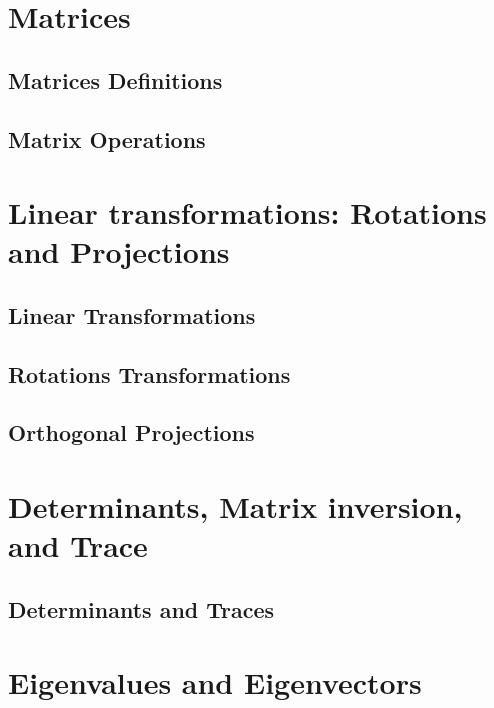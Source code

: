 \documentclass[11pt]{beamer}
\begin{document}
\section{Matrices}
\subsection{Matrices Definitions}
  
\subsection{Matrix Operations}



\section{Linear transformations: Rotations and Projections}
\subsection{Linear Transformations}


\subsection{Rotations Transformations}


\subsection{Orthogonal Projections}


\section{Determinants, Matrix inversion, and Trace}
\subsection{Determinants and Traces}



\section{Eigenvalues and Eigenvectors}
\end{document}
